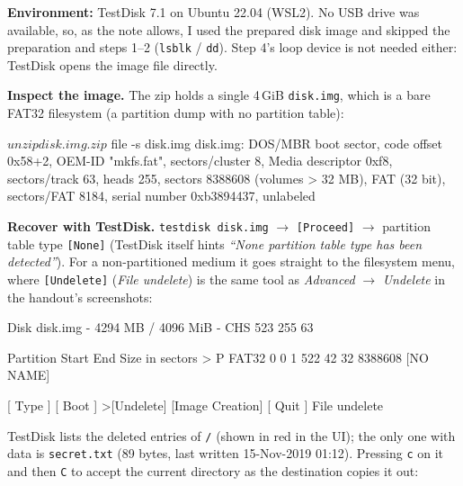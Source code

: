 \documentclass[a4paper, 10pt]{article}
\begin{document}
\begin{solution}
	\noindent \textbf{Environment:} TestDisk 7.1 on Ubuntu 22.04 (WSL2). No USB drive was available,
	so, as the note allows, I used the prepared disk image and skipped the preparation and steps 1--2
	(\texttt{lsblk} / \texttt{dd}). Step 4's loop device is not needed either: TestDisk opens the
	image file directly.

	\myspace

	\noindent \textbf{Inspect the image.} The zip holds a single 4\,GiB \texttt{disk.img}, which is a
	bare FAT32 filesystem (a partition dump with no partition table):

	\myspace

	\begin{codingbox*}[numbers=none, xleftmargin=0pt, belowskip=6pt, basicstyle=\ttfamily\footnotesize\color{editortext}]
$ unzip disk.img.zip
$ file -s disk.img
disk.img: DOS/MBR boot sector, code offset 0x58+2, OEM-ID "mkfs.fat", sectors/cluster 8,
Media descriptor 0xf8, sectors/track 63, heads 255, sectors 8388608 (volumes > 32 MB),
FAT (32 bit), sectors/FAT 8184, serial number 0xb3894437, unlabeled
\end{codingbox*}

	\noindent \textbf{Recover with TestDisk.} \texttt{testdisk disk.img} $\rightarrow$
	\texttt{[Proceed]} $\rightarrow$ partition table type \texttt{[None]} (TestDisk itself hints
	\textit{``None partition table type has been detected''}). For a non-partitioned medium it goes
	straight to the filesystem menu, where \texttt{[Undelete]} (\textit{File undelete}) is the
	same tool as \textit{Advanced} $\rightarrow$ \textit{Undelete} in the handout's screenshots:

	\myspace

	\begin{codingbox*}[numbers=none, xleftmargin=0pt, belowskip=6pt, basicstyle=\ttfamily\footnotesize\color{editortext}]
Disk disk.img - 4294 MB / 4096 MiB - CHS 523 255 63

     Partition                  Start        End    Size in sectors
>   P FAT32                    0   0  1   522  42 32    8388608 [NO NAME]

 [  Type  ]  [  Boot  ] >[Undelete]  [Image Creation]  [  Quit  ]
                                 File undelete
\end{codingbox*}

	\noindent TestDisk lists the deleted entries of \texttt{/} (shown in red in the UI); the only
	one with data is \texttt{secret.txt} (89 bytes, last written 15-Nov-2019 01:12). Pressing
	\texttt{c} on it and then \texttt{C} to accept the current directory as the destination copies
	it out:


\end{solution}
\end{document}
